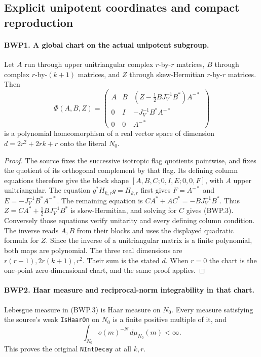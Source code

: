 \subsection{Explicit unipotent coordinates and compact reproduction}

\paragraph{BWP1. A global chart on the actual unipotent subgroup.}
\label{claim:BWP1}
Let \(A\) run through upper unitriangular complex \(r\)-by-\(r\)
matrices, \(B\) through complex \(r\)-by-\((k+1)\) matrices,
and \(Z\) through skew-Hermitian \(r\)-by-\(r\) matrices.
Then
\[
 \Phi(A,B,Z)=
 \begin{pmatrix}
 A&B&(Z-\tfrac12BJ_V^{-1}B^*)A^{-*}\\
 0&I&-J_V^{-1}B^*A^{-*}\\
 0&0&A^{-*}
 \end{pmatrix}
 \tag{BWP.3}
\]
is a polynomial homeomorphism of a real vector space of dimension
\(d=2r^2+2rk+r\) onto the literal \(N_0\).

\begin{proof}
The source fixes the successive isotropic flag quotients pointwise,
and fixes the quotient of its orthogonal complement by that flag.
Its defining column equations therefore give the block shape
\([A,B,C;0,I,E;0,0,F]\), with \(A\) upper unitriangular.
The equation \(g^*H_{k,r}g=H_{k,r}\) first gives
\(F=A^{-*}\) and \(E=-J_V^{-1}B^*A^{-*}\).
The remaining equation is
\(CA^*+AC^*=-BJ_V^{-1}B^*\).
Thus \(Z=CA^*+\tfrac12BJ_V^{-1}B^*\) is skew-Hermitian,
and solving for \(C\) gives (BWP.3).  Conversely those equations
verify unitarity and every defining column condition.
The inverse reads \(A,B\) from their blocks and uses the displayed
quadratic formula for \(Z\).  Since the inverse of a unitriangular
matrix is a finite polynomial, both maps are polynomial.
The three real dimensions are \(r(r-1),2r(k+1),r^2\).
Their sum is the stated \(d\).  When \(r=0\) the chart is the
one-point zero-dimensional chart, and the same proof applies.
\end{proof}

\paragraph{BWP2. Haar measure and reciprocal-norm integrability in that chart.}
\label{claim:BWP2}
Lebesgue measure in (BWP.3) is Haar measure on \(N_0\).
Every measure satisfying the source's weak \texttt{IsHaarOn}
on \(N_0\) is a finite positive multiple of it, and
\[
 \int_{N_0}o(m)^{-N}\,d\mu_{N_0}(m)<\infty.
 \tag{BWP.4}
\]
This proves the original \texttt{NIntDecay} at all \(k,r\).


